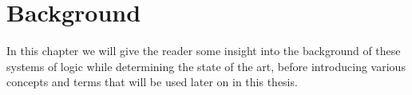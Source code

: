 \section{Background}\label{sec:back}

In this chapter we will give the reader some insight into the background of these systems of logic while determining the state of the art, before introducing various concepts and terms that will be used later on in this thesis.








